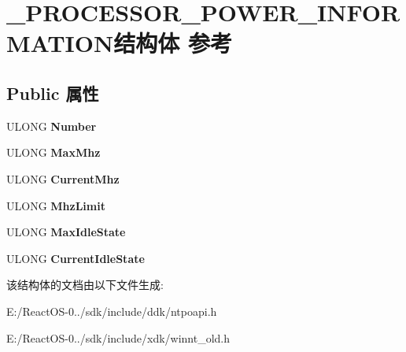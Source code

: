 \hypertarget{struct___p_r_o_c_e_s_s_o_r___p_o_w_e_r___i_n_f_o_r_m_a_t_i_o_n}{}\section{\+\_\+\+P\+R\+O\+C\+E\+S\+S\+O\+R\+\_\+\+P\+O\+W\+E\+R\+\_\+\+I\+N\+F\+O\+R\+M\+A\+T\+I\+O\+N结构体 参考}
\label{struct___p_r_o_c_e_s_s_o_r___p_o_w_e_r___i_n_f_o_r_m_a_t_i_o_n}
\subsection*{Public 属性}
\begin{DoxyCompactItemize}
\item 
\mbox{\label{struct___p_r_o_c_e_s_s_o_r___p_o_w_e_r___i_n_f_o_r_m_a_t_i_o_n_a70acaf6f6f78fe591b237a7c012d633b}} 
U\+L\+O\+NG {\bfseries Number}
\item 
\mbox{\label{struct___p_r_o_c_e_s_s_o_r___p_o_w_e_r___i_n_f_o_r_m_a_t_i_o_n_aeac9bd296e04718e7df79f4371688fc2}} 
U\+L\+O\+NG {\bfseries Max\+Mhz}
\item 
\mbox{\label{struct___p_r_o_c_e_s_s_o_r___p_o_w_e_r___i_n_f_o_r_m_a_t_i_o_n_a6e5f293c9b391c23259967e474a8ac08}} 
U\+L\+O\+NG {\bfseries Current\+Mhz}
\item 
\mbox{\label{struct___p_r_o_c_e_s_s_o_r___p_o_w_e_r___i_n_f_o_r_m_a_t_i_o_n_aab710a52f5f9ed2c8465266a9d1d3680}} 
U\+L\+O\+NG {\bfseries Mhz\+Limit}
\item 
\mbox{\label{struct___p_r_o_c_e_s_s_o_r___p_o_w_e_r___i_n_f_o_r_m_a_t_i_o_n_ab6e85b2db203bc72eee67cd13479c23e}} 
U\+L\+O\+NG {\bfseries Max\+Idle\+State}
\item 
\mbox{\label{struct___p_r_o_c_e_s_s_o_r___p_o_w_e_r___i_n_f_o_r_m_a_t_i_o_n_ab70701c37a2f8c070f2712bdb419bd16}} 
U\+L\+O\+NG {\bfseries Current\+Idle\+State}
\end{DoxyCompactItemize}


该结构体的文档由以下文件生成\+:\begin{DoxyCompactItemize}
\item 
E\+:/\+React\+O\+S-\/0../sdk/include/ddk/ntpoapi.\+h\item 
E\+:/\+React\+O\+S-\/0../sdk/include/xdk/winnt\+\_\+old.\+h\end{DoxyCompactItemize}
